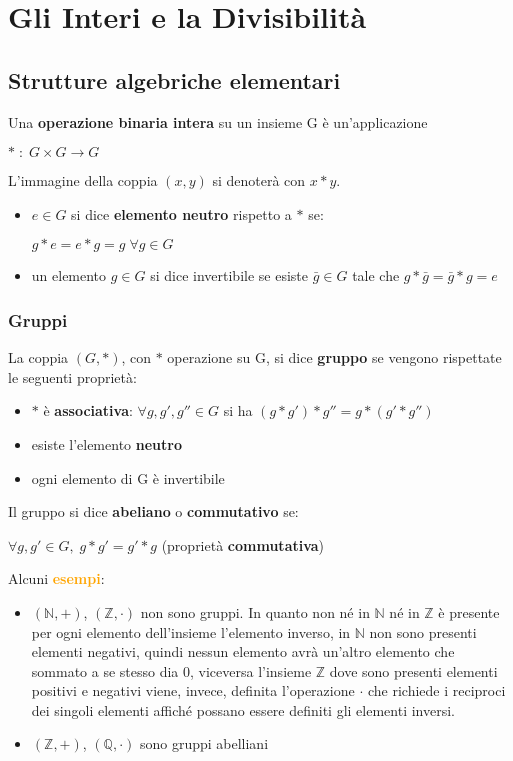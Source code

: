\chapter{Gli Interi e la Divisibilità}
\section{Strutture algebriche elementari}
Una \textbf{operazione binaria intera} su un insieme G è un'applicazione 
\begin{center}
    $\ast \; : \; G \times G \rightarrow G$
\end{center}
L'immagine della coppia $(x,y)$ si denoterà con $x \ast y$. 
\begin{itemize}[nosep]
    \item $e \in G$ si dice \textbf{elemento neutro} rispetto a $\ast$ se:
    \begin{center}
        $g \ast e = e \ast g = g \; \forall g \in G$
    \end{center}
    \item un elemento $g \in G$ si dice invertibile se esiste $\bar{g} \in G$ tale che $g * \bar{g} = \bar{g} * g = e$
\end{itemize}

\subsection{Gruppi}
La coppia $(G, \ast)$, con $\ast$ operazione su G, si dice \textbf{gruppo} se vengono rispettate le seguenti proprietà:
\begin{itemize}[nosep]
    \item $\ast$ è \textbf{associativa}: $\forall g, g', g'' \in G$ si ha $(g \ast g') \ast g'' = g \ast (g' \ast g'')$
    \item esiste l'elemento \textbf{neutro}
    \item ogni elemento di G è invertibile
\end{itemize}
Il gruppo si dice \textbf{abeliano} o \textbf{commutativo} se: 
\begin{center}
    $\forall g, g' \in G, \; g \ast g' = g' \ast g$ (proprietà \textbf{commutativa})
\end{center}
Alcuni \textcolor{orange}{\textbf{esempi}}:
\begin{itemize}[nosep]
    \item $(\mathbb{N}, +)$, $(\mathbb{Z}, \cdot)$ non sono gruppi. In quanto non né in $\mathbb{N}$ né in $\mathbb{Z}$ è presente per ogni elemento dell'insieme l'elemento inverso, in $\mathbb{N}$ non sono presenti elementi negativi, quindi nessun elemento avrà un'altro elemento che sommato a se stesso dia 0, viceversa l'insieme $\mathbb{Z}$ dove sono presenti elementi positivi e negativi viene, invece, definita l'operazione $\cdot$ che richiede i reciproci dei singoli elementi affiché possano essere definiti gli elementi inversi.
    \item $(\mathbb{Z}, +)$, $(\mathbb{Q}, \cdot)$ sono gruppi abelliani
\end{itemize}

